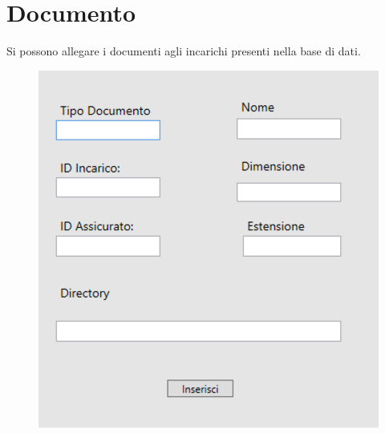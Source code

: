 \documentclass[a4paper,12pt]{report}
\begin{document}
\section{Documento}
Si possono allegare i documenti agli incarichi presenti nella base di dati.

\begin{figure}[ht]
    \begin{center}
        \centering
        \includegraphics[scale=0.6]{img/Applicazione/Documento.png}
    \end{center}
\end{figure}
\end{document}

